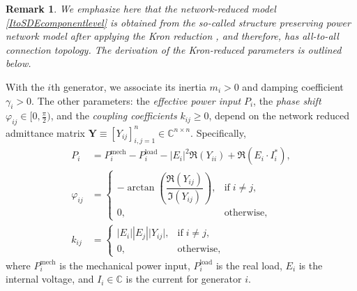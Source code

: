 \documentclass[10pt,twocolumn]{IEEEtran}
\newtheorem{remark}{Remark}
\begin{document}
\begin{remark}
We emphasize here that the network-reduced model \eqref{ItoSDEcomponentlevel} is obtained from the so-called structure preserving power network model \cite{odun2012structure} after applying the Kron reduction \cite{dorfler2012kron}, and therefore, has all-to-all connection topology. The derivation of the Kron-reduced parameters is outlined below.
\end{remark}

With the $i$th generator, we associate its inertia $m_{i}>0$ and damping coefficient $\gamma_{i}>0$. The other parameters: the \emph{effective power input} $P_{i}$, the \emph{phase shift} $\varphi_{ij}\in[0,\frac{\pi}{2})$, and the \emph{coupling coefficients} $k_{ij}\geq 0$, depend on the network reduced admittance matrix $\bm{Y}\equiv[Y_{ij}]_{i,j=1}^{n}\in\mathbb{C}^{n\times n}$. Specifically,
\begin{subequations}
\begin{align}
 P_{i} &= P_{i}^{\text{mech}} - P_{i}^{\text{load}} - |E_{i}|^{2} \Re\left(Y_{ii}\right) + \Re\left(E_i \cdot I_{i}^{*}\right),\label{defPi}\\
 \varphi_{ij} &= \begin{cases} -\arctan\left(\dfrac{\Re\left(Y_{ij}\right)}{\Im\left(Y_{ij}\right)}\right), & \text{if}\;i\neq j,\\
 0, & \text{otherwise},
 \end{cases}\\
 k_{ij} &= \begin{cases} |E_{i}| |E_{j}| \vert Y_{ij}\vert, & \text{if}\;i\neq j,\\
 0, & \text{otherwise},
 \end{cases}
\end{align}
\label{DefParam}
\end{subequations}
where $P_{i}^{\text{mech}}$ is the mechanical power input, $P_{i}^{\text{load}}$ is the real load, $E_{i}$ is the internal voltage, and $I_{i}\in\mathbb{C}$ is the current for generator $i$.

\end{document}
